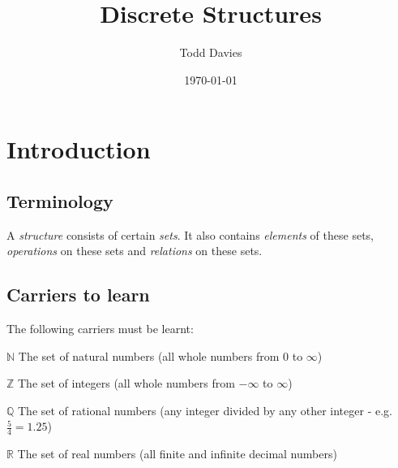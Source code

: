 \documentclass{article}
\author{Todd Davies}
\title{Discrete Structures}
\date{\today}
\begin{document}
\lhead{\today}

\maketitle

\section{Introduction}

\subsection{Terminology}

A {\it structure} consists of certain {\it sets}. It also contains {\it elements} of these sets, {\it operations} on these sets and {\it relations} on these sets.

\subsection{Carriers to learn}

The following carriers must be learnt:

$\mathbb{N}$ The set of natural numbers (all whole numbers from $0$ to $\infty$)

$\mathbb{Z}$ The set of integers (all whole numbers from $-\infty$ to $\infty$)

$\mathbb{Q}$ The set of rational numbers (any integer divided by any other integer - e.g. $\frac{5}{4}=1.25$)

$\mathbb{R}$ The set of real numbers (all finite and infinite decimal numbers)
\end{document}

